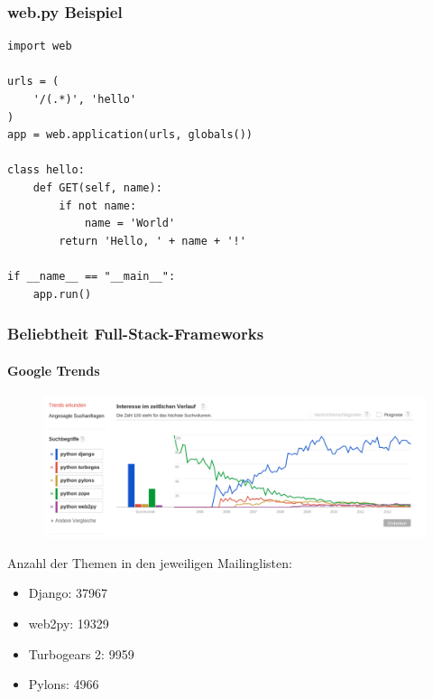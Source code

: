 \documentclass[
    t,
    smaller,
    compress,
    xcolor=svgnames,            %
    table,
]{beamer}
\begin{document}
\begin{frame}[fragile]
  \frametitle{web.py Beispiel}


  \begin{lstlisting}
import web

urls = (
    '/(.*)', 'hello'
)
app = web.application(urls, globals())

class hello:
    def GET(self, name):
        if not name:
            name = 'World'
        return 'Hello, ' + name + '!'

if __name__ == "__main__":
    app.run()

    \end{lstlisting}
\end{frame}


\begin{frame}
  \frametitle{Beliebtheit Full-Stack-Frameworks}
  \framesubtitle{Google Trends}
    \vspace{-12pt}
     \begin{figure}
         \includegraphics[width=1.0\textwidth]{trends.png}

     \end{figure}
     \vspace{-12pt}
     Anzahl der Themen in den jeweiligen Mailinglisten:
     \vspace{8pt}
      \begin{itemize}[<1->]
        \item Django: 37967
        \item web2py: 19329
        \item Turbogears 2: 9959
        \item Pylons: 4966
     \end{itemize}

\end{frame}
\end{document}
